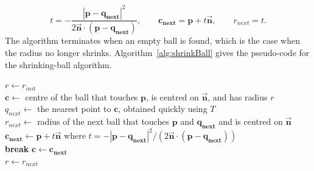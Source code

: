 \[
t = -\frac{|\mathbf{p} - \mathbf{q_{next}}|^2}{2 \vec{\mathbf{n}} \cdot (\mathbf{p} - \mathbf{q_{next}})},
\qquad
\mathbf{c_{next}} = \mathbf{p} + t \vec{\mathbf{n}},
\qquad
r_{next} = t.
\]
The algorithm terminates when an empty ball is found, which is the case when the radius no longer shrinks.
Algorithm~\ref{alg:shrinkBall} gives the pseudo-code for the shrinking-ball algorithm.
\begin{algorithm}[htbp]
	\DontPrintSemicolon{}
	$r \leftarrow r_{init}$ \\
	$\mathbf{c} \leftarrow$ centre of the ball that touches $\mathbf{p}$, is centred on $\vec{\mathbf{n}}$, and has radius $r$ \\
	 {
		$q_{next} \leftarrow$ the nearest point to $\mathbf{c}$, obtained quickly using $T$ \\
		$r_{next} \leftarrow$ radius of the next ball that touches $\mathbf{p}$ and $\mathbf{q_{next}}$ and is centred on $\vec{\mathbf{n}}$ \\
		$\mathbf{c_{next}} \leftarrow \mathbf{p} + t \vec{\mathbf{n}}$ where $t = -|\mathbf{p} - \mathbf{q_{next}}|^2 / (2 \vec{\mathbf{n}} \cdot (\mathbf{p} - \mathbf{q_{next}}))$ \\
		 {
			\textbf{break}
		}
		$\mathbf{c} \leftarrow \mathbf{c_{next}}$ \\
		$r \leftarrow r_{next}$
	}
	\caption{The shrinking-ball algorithm.}
	\label{alg:shrinkBall}
\end{algorithm}

